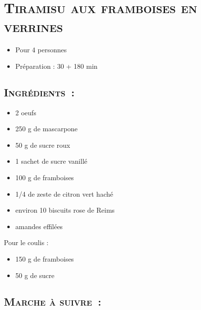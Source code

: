 \section[\normalsize{Tiramisu aux framboises en verrines}]{\LARGE{\textsc{Tiramisu aux framboises en verrines}}}		%


\begin{itemize}
\item Pour 4 personnes
\item Préparation : 30 + 180 min
\end{itemize}

\subsection*{\textsc{Ingr\'edients~:}}

\begin{itemize}
\item 2 oeufs
\item 250 g de mascarpone
\item 50 g de sucre roux
\item 1 sachet de sucre vanill\'e
\item 100 g de framboises
\item 1/4 de zeste de citron vert hach\'e
\item environ 10 biscuits rose de Reims
\item amandes effil\'ees
\end{itemize}
Pour le coulis :
\begin{itemize}
\item 150 g de framboises
\item 50 g de sucre
\end{itemize}

\subsection*{\textsc{Marche \`a suivre~:}}

